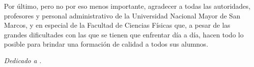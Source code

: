 \documentclass[12pt, a4paper, oneside]{book}
\begin{document}
Por último, pero no por eso menos importante, agradecer a todas las autoridades, profesores y personal administrativo de la Universidad Nacional Mayor de San Marcos, y en especial de la Facultad de Ciencias Físicas que, a pesar de las grandes dificultades con las que se tienen que enfrentar día a día, hacen todo lo posible para brindar una formación de calidad a todos sus alumnos.

\newpage

\tableofcontents

\listoffigures

\newpage

\begin{center}
	\thispagestyle{empty}
	\hspace{0pt}
	\vfill
	\textit{Dedicado a .}
	\vfill
	\hspace{0pt}
\end{center}

\mainmatter






\printbibliography
{}
\end{document}
